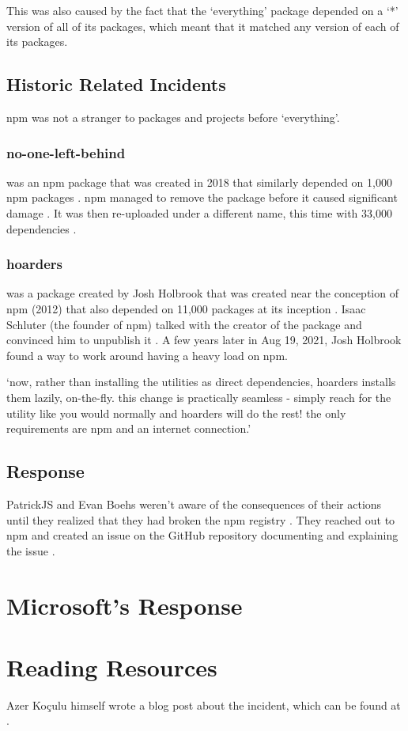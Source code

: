 \documentclass[acmsmall]{acmart}
\begin{document}
This was also caused by the fact that the `everything' package depended on a `*' version
of all of its packages, which meant that it matched any version of each of its packages.

\subsection{Historic Related Incidents}
npm was not a stranger to packages and projects before `everything'.

\subsubsection{no-one-left-behind}
was an npm package that was created in 2018 that similarly depended
on 1,000 npm packages \cite{npm-no-one-left-behind-dependencies}. npm managed to remove
the package before it caused significant damage \cite{npm-no-one-left-behind-security}.
It was then re-uploaded under a different name, this time with 33,000 dependencies \cite{socket-everything}.

\subsubsection{hoarders}
was a package created by Josh Holbrook that was created near the conception of npm (2012) that
also depended on 11,000 packages at its inception \cite{github-hoarders-dependencies}.
Isaac Schluter (the founder of npm) talked with the creator of the package and convinced
him to unpublish it \cite{github-hoarders}.  A few years later in Aug 19, 2021, Josh Holbrook
found a way to work around having a heavy load on npm.

`now, rather than installing the utilities as direct dependencies, hoarders
installs them lazily, on-the-fly. this change is practically seamless - simply
reach for the utility like you would normally and hoarders will do the rest! the
only requirements are npm and an internet connection.' \cite{github-hoarders}

\subsection{Response}
PatrickJS and Evan Boehs weren't aware of the consequences of their actions
until they realized that they had broken the npm registry
\cite{youtube-everything}. They reached out to npm and created an issue on the
GitHub repository documenting and explaining the issue
\cite{bleepingcomputer-everything}.

\section{Microsoft's Response}





\appendix
\section{Reading Resources}
Azer Koçulu himself wrote a blog post about the incident, which can be found at \cite{medium-azer}.
\end{document}
